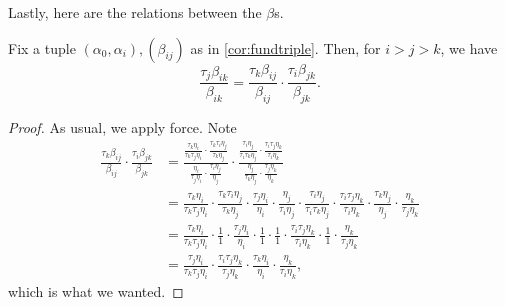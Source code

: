 Lastly, here are the relations between the $\beta$s.
\begin{lemma}
	Fix a tuple $(\alpha_0,\alpha_i),(\beta_{ij})$ as in \autoref{cor:fundtriple}. Then, for $i>j>k$, we have
	\[\frac{\tau_j\beta_{ik}}{\beta_{ik}}=\frac{\tau_k\beta_{ij}}{\beta_{ij}}\cdot\frac{\tau_i\beta_{jk}}{\beta_{jk}}.\]
\end{lemma}
\begin{proof}
	As usual, we apply force. Note
	\begin{align*}
		\frac{\tau_k\beta_{ij}}{\beta_{ij}}\cdot\frac{\tau_i\beta_{jk}}{\beta_{jk}} &= \frac{\displaystyle\frac{\tau_k\eta_i}{\tau_k\tau_j\eta_i}\cdot\frac{\tau_k\tau_i\eta_j}{\tau_k\eta_j}}
		{\displaystyle\frac{\eta_i}{\tau_j\eta_i}\cdot\frac{\tau_i\eta_j}{\eta_j}}\cdot
		\frac{\displaystyle\frac{\tau_i\eta_j}{\tau_i\tau_k\eta_j}\cdot\frac{\tau_i\tau_j\eta_k}{\tau_i\eta_k}}
		{\displaystyle\frac{\eta_j}{\tau_k\eta_j}\cdot\frac{\tau_j\eta_k}{\eta_k}} \\
		&= \frac{\tau_k\eta_i}{\tau_k\tau_j\eta_i}\cdot\frac{\tau_k\tau_i\eta_j}{\tau_k\eta_j}\cdot
		\frac{\tau_j\eta_i}{\eta_i}\cdot\frac{\eta_j}{\tau_i\eta_j}\cdot
		\frac{\tau_i\eta_j}{\tau_i\tau_k\eta_j}\cdot\frac{\tau_i\tau_j\eta_k}{\tau_i\eta_k}\cdot
		\frac{\tau_k\eta_j}{\eta_j}\cdot\frac{\eta_k}{\tau_j\eta_k} \\
		&= \frac{\tau_k\eta_i}{\tau_k\tau_j\eta_i}\cdot
		\frac11\cdot
		\frac{\tau_j\eta_i}{\eta_i}\cdot
		\frac11\cdot
		\frac11\cdot
		\frac{\tau_i\tau_j\eta_k}{\tau_i\eta_k}\cdot
		\frac11\cdot\frac{\eta_k}{\tau_j\eta_k} \\
		&= \frac{\tau_j\eta_i}{\tau_k\tau_j\eta_i}\cdot
		\frac{\tau_i\tau_j\eta_k}{\tau_j\eta_k}\cdot
		\frac{\tau_k\eta_i}{\eta_i}\cdot
		\frac{\eta_k}{\tau_i\eta_k},
	\end{align*}
	which is what we wanted.
\end{proof}